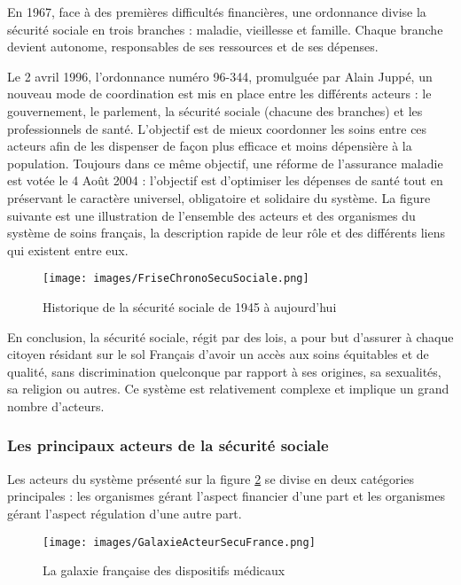 En 1967, face à des premières difficultés financières, une ordonnance divise la sécurité sociale en trois branches : maladie, vieillesse et famille. Chaque branche devient autonome, responsables de ses ressources et de ses dépenses.

Le 2 avril 1996, l'ordonnance numéro 96-344, promulguée par Alain Juppé, un nouveau mode de coordination est mis en place entre les différents acteurs : le gouvernement, le parlement, la sécurité sociale (chacune des branches) et les professionnels de santé. L'objectif est de mieux coordonner les soins entre ces acteurs afin de les dispenser de façon plus efficace et moins dépensière à la population. 
Toujours dans ce même objectif, une réforme de l'assurance maladie est votée le 4 Août 2004 : l'objectif est d'optimiser les dépenses de santé tout en préservant le caractère universel, obligatoire et solidaire du système. La figure suivante est une illustration de l'ensemble des acteurs et des organismes du système de soins français, la description rapide de leur rôle et des différents liens qui existent entre eux.

\begin{figure}[htbp]
\begin{center}
\texttt{[image: images/FriseChronoSecuSociale.png]} 
\caption{Historique de la sécurité sociale de 1945 à aujourd'hui} \label{Historique de la securite sociale de 1945 a aujourd'hui}
\end{center}
\end{figure}

En conclusion, la sécurité sociale, régit par des lois, a pour but d'assurer à chaque citoyen résidant sur le sol Français d'avoir un accès aux soins équitables et de qualité, sans discrimination quelconque par rapport à ses origines, sa sexualités, sa religion ou autres.
Ce système est relativement complexe et implique un grand nombre d'acteurs.

\subsubsection{Les principaux acteurs de la sécurité sociale}

Les acteurs du système présenté sur la figure \ref{GalaxieDM} se divise en deux catégories principales : les organismes gérant l'aspect financier d'une part et les organismes gérant l'aspect régulation d'une autre part. 

\begin{figure}[htbp]
\begin{center}
\texttt{[image: images/GalaxieActeurSecuFrance.png]}
\end{center}
\caption{\label{GalaxieDM} La galaxie française des dispositifs médicaux}
\end{figure}

